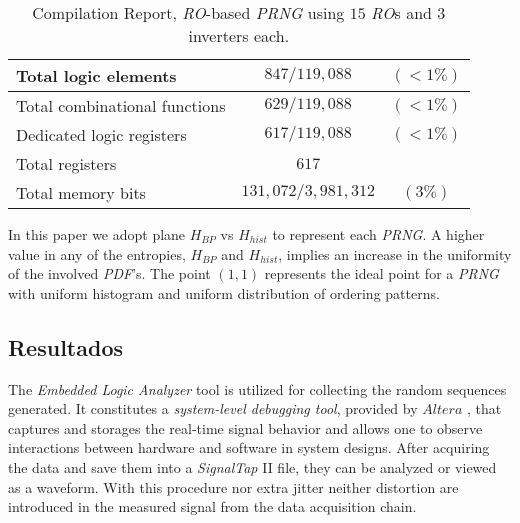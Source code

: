 \begin{table}
\begin{center}
\begin{tabular}{| l | c  c | }
 \hline
 
\footnotesize{Total logic elements} & $847/119,088$ & $ ( < 1 \%)$\\

 \hline
 
\footnotesize{Total combinational functions} &  $629/119,088$ & $( < 1 \%)$ \\

 \hline
 
\footnotesize{Dedicated logic registers} & $617/119,088$ & $( < 1 \%)$ \\

 \hline
 
\footnotesize{Total registers} &  $617$ &   \\

 \hline
 
\footnotesize{Total memory bits} &  $131,072/3,981,312$ & $( 3 \%)$ \\

 \hline
 
\end{tabular}
\end{center}
\caption{Compilation Report, \emph{RO}-based \emph{PRNG} using $15$ \emph{RO}s and $3$ inverters each.}
\label{compilation}

\end{table}





In this paper we adopt plane $H_{BP}$ vs $H_{hist}$ \cite{DeMicco2008}  to represent each \emph{PRNG}. A higher
value in any of the entropies, $H_{BP}$ and $H_{hist}$, implies an
increase in the uniformity of the involved \emph{PDF}'s. The point
$(1,1)$ represents the ideal point for a \emph{PRNG} with uniform histogram and
uniform distribution of ordering patterns.

\subsection{Resultados}
\label{sec:results}

The  \emph{Embedded Logic Analyzer} tool is utilized for collecting the random sequences generated.
It constitutes a \emph{system-level debugging tool}, provided by $Altera$  \cite{QUARTUS}, that captures and storages the real-time signal behavior and allows one to observe interactions between hardware and software in system designs. After acquiring
the data and  save them into a \emph{SignalTap} II file, they can be
analyzed or viewed as a waveform. With this procedure nor extra jitter neither distortion are introduced in the measured signal from the data acquisition chain.

